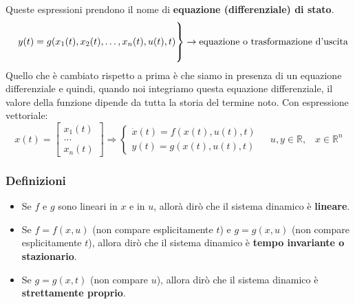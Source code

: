 Queste espressioni prendono il nome di \textbf{equazione (differenziale) di stato}.
\[
    \begin{rcases}
        \\
        \;\;\;\; y(t) = g(x_1(t),x_2(t), \dots, x_n(t), u(t), t)\\
        \\
    \end{rcases} \rightarrow \text{equazione o trasformazione d'uscita}\;
\]
Quello che è cambiato rispetto a prima è che siamo in presenza di un equazione differenziale e quindi, quando noi integriamo questa equazione differenziale, il valore della funzione dipende da tutta la storia del termine noto.\newline
\newline
Con espressione vettoriale:
\[
    x(t) = \left[\begin{matrix}
        x_1(t)\\
        \dots\\
        x_n(t)
    \end{matrix}\right] \Rightarrow  \begin{cases}
        \dot{x}(t) = f(x(t), u(t),t)\\
        y(t) = g(x(t),u(t),t)
    \end{cases} \;\;\;\;u,y \in \mathbb{R}, \;\;\;x \in \mathbb{R}^n
\]
\subsubsection{Definizioni}
\begin{itemize}
    \item Se $f$ e $g$ sono lineari in $x$ e in $u$, allorà dirò che il sistema dinamico è \textbf{lineare}.
    \item Se $f = f(x,u)$ (non compare esplicitamente $t$) e $g = g(x,u)$ (non compare esplicitamente $t$), allora dirò che il sistema dinamico è \textbf{tempo invariante o stazionario}.
    \item Se $g = g(x,t)$ (non compare $u$), allora dirò che il sistema dinamico è \textbf{strettamente proprio}.
\end{itemize}
